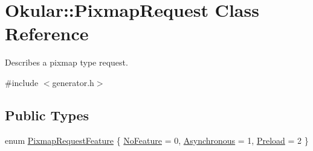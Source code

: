 \hypertarget{classOkular_1_1PixmapRequest}{\section{Okular\+:\+:Pixmap\+Request Class Reference}
\label{classOkular_1_1PixmapRequest}
}


Describes a pixmap type request.  




{\ttfamily \#include $<$generator.\+h$>$}

\subsection*{Public Types}
\begin{DoxyCompactItemize}
\item 
enum \hyperlink{classOkular_1_1PixmapRequest_a34c6774277612c3af3743fdd44ab0cba}{Pixmap\+Request\+Feature} \{ \hyperlink{classOkular_1_1PixmapRequest_a34c6774277612c3af3743fdd44ab0cbaa261878d242ff5e2b1b8bd67e65393487}{No\+Feature} = 0, 
\hyperlink{classOkular_1_1PixmapRequest_a34c6774277612c3af3743fdd44ab0cbaa1c086a3111f9332b7a0b6d8ff0ab967f}{Asynchronous} = 1, 
\hyperlink{classOkular_1_1PixmapRequest_a34c6774277612c3af3743fdd44ab0cbaa4427fae872bbdb33b00315fee62edbe6}{Preload} = 2
 \}
\end{DoxyCompactItemize}
